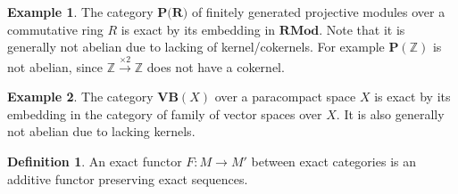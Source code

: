 \documentclass{article}
\theoremstyle{definition}
\theoremstyle{definition}
\newtheorem{definition}{Definition}[theorem]
\theoremstyle{definition}
\theoremstyle{definition}
\theoremstyle{definition}
\theoremstyle{definition}
\theoremstyle{definition}
\newtheorem{example}{Example}[theorem]
\begin{document}
\begin{tcolorbox}[colback=yellow!5!white,colframe=yellow!30!white]
\begin{example}
The category $\textbf{P(R)}$ of finitely generated projective modules over a commutative ring $R$ is exact by its embedding in $\textbf{RMod}$. Note that it is generally not abelian due to lacking of kernel/cokernels. For example $\textbf{P}(\mathbb{Z})$ is not abelian, since $\mathbb{Z}\xrightarrow{\times 2}\mathbb{Z}$ does not have a cokernel. 
\end{example}
\end{tcolorbox}

\begin{tcolorbox}[colback=yellow!5!white,colframe=yellow!30!white]
\begin{example}
The category $\textbf{VB}(X)$ over a paracompact space $X$ is exact by its embedding in the category of family of vector spaces over $X$. It is also generally not abelian due to lacking kernels. 
\end{example}
\end{tcolorbox}



\begin{tcolorbox}[colback=purple!5!white,colframe=purple!75!black]
\begin{definition}
An exact functor $F: M\to M'$ between exact categories is an additive functor preserving exact sequences.
\end{definition}
\end{tcolorbox}
\end{document}
